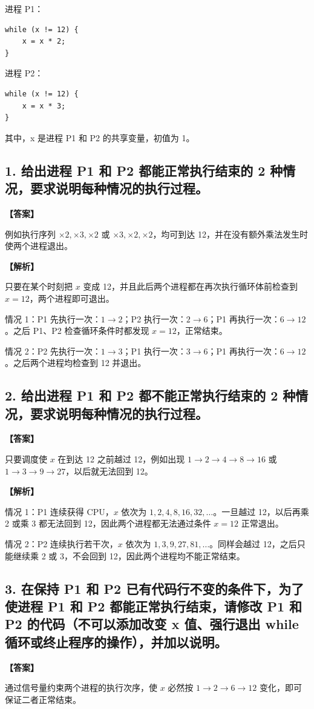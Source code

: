 \documentclass[UTF8,12pt]{ctexart}
\newenvironment{explanation}{\par\noindent\textbf{【解析】}\par\smallskip}{\par\medskip}
\newenvironment{answer}{\par\noindent\textbf{【答案】}\par\smallskip}{\par}
\begin{document}
进程 P1：
\begin{lstlisting}
while (x != 12) {
    x = x * 2;
}
\end{lstlisting}

进程 P2：
\begin{lstlisting}
while (x != 12) {
    x = x * 3;
}
\end{lstlisting}

其中，x 是进程 P1 和 P2 的共享变量，初值为 1。

\subsection*{1. 给出进程 P1 和 P2 都能正常执行结束的 2 种情况，要求说明每种情况的执行过程。}
\begin{answer}
例如执行序列 $\times2,\times3,\times2$ 或 $\times3,\times2,\times2$，均可到达 12，并在没有额外乘法发生时使两个进程退出。
\end{answer}

\begin{explanation}
只要在某个时刻把 $x$ 变成 12，并且此后两个进程都在再次执行循环体前检查到 $x=12$，两个进程即可退出。

情况 1：P1 先执行一次：$1\to2$；P2 执行一次：$2\to6$；P1 再执行一次：$6\to12$。之后 P1、P2 检查循环条件时都发现 $x=12$，正常结束。

情况 2：P2 先执行一次：$1\to3$；P1 执行一次：$3\to6$；P1 再执行一次：$6\to12$。之后两个进程均检查到 12 并退出。
\end{explanation}
\subsection*{2. 给出进程 P1 和 P2 都不能正常执行结束的 2 种情况，要求说明每种情况的执行过程。}
\begin{answer}
只要调度使 $x$ 在到达 12 之前越过 12，例如出现 $1\to2\to4\to8\to16$ 或 $1\to3\to9\to27$，以后就无法回到 12。
\end{answer}

\begin{explanation}
情况 1：P1 连续获得 CPU，$x$ 依次为 $1,2,4,8,16,32,\ldots$。一旦越过 12，以后再乘 2 或乘 3 都无法回到 12，因此两个进程都无法通过条件 $x=12$ 正常退出。

情况 2：P2 连续执行若干次，$x$ 依次为 $1,3,9,27,81,\ldots$。同样会越过 12，之后只能继续乘 2 或 3，不会回到 12，因此两个进程均不能正常结束。
\end{explanation}
\subsection*{3. 在保持 P1 和 P2 已有代码行不变的条件下，为了使进程 P1 和 P2 都能正常执行结束，请修改 P1 和 P2 的代码（不可以添加改变 x 值、强行退出 while 循环或终止程序的操作），并加以说明。}
\begin{answer}
通过信号量约束两个进程的执行次序，使 $x$ 必然按 $1\to2\to6\to12$ 变化，即可保证二者正常结束。
\end{answer}
\end{document}
